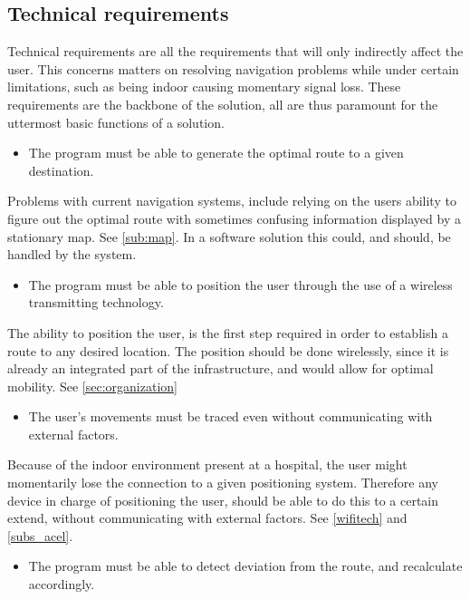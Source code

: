\subsection{Technical requirements}

Technical requirements are all the requirements that will only indirectly affect the user. This concerns matters on resolving navigation problems while under certain limitations, such as being indoor causing momentary signal loss. These requirements are the backbone of the solution, all are thus paramount for the uttermost basic functions of a solution.

\begin{itemize}
	\item The program must be able to generate the optimal route to a given destination.
\end{itemize}

Problems with current navigation systems, include relying on the users ability to figure out the optimal route with sometimes confusing information displayed by a stationary map. See \cref{sub:map}. In a software solution this could, and should, be handled by the system.

\begin{itemize}
	\item The program must be able to position the user through the use of a wireless transmitting technology.
\end{itemize}

The ability to position the user, is the first step required in order to establish a route to any desired location. The position should be done wirelessly, since it is already an integrated part of the infrastructure, and would allow for optimal mobility. See \cref{sec:organization}

\begin{itemize}
	\item The user's movements must be traced even without communicating with external factors.
\end{itemize}

Because of the indoor environment present at a hospital, the user might momentarily lose the connection to a given positioning system. Therefore any device in charge of positioning the user, should be able to do this to a certain extend, without communicating with external factors. See \cref{wifitech} and \cref{subs_acel}.

\begin{itemize}
	\item The program must be able to detect deviation from the route, and recalculate accordingly.
\end{itemize}

